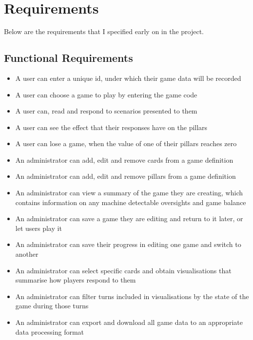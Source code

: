 \chapter{Requirements}


Below are the requirements that I specified early on in the project.

\section{Functional Requirements}

\begin{itemize}
        \item A user can enter a unique id, under which their game data will be recorded
        \item A user can choose a game to play by entering the game code
        \item A user can, read and respond to scenarios presented to them
        \item A user can see the effect that their responses have on the pillars
        \item A user can lose a game, when the value of one of their pillars reaches zero
        \item  An administrator can add, edit and remove cards from a game definition
        \item  An administrator can add, edit and remove pillars from a game definition
        \item  An administrator can view a summary of the game they are creating, which contains information on any machine detectable oversights and game balance 
        \item  An administrator can save a game they are editing and return to it later, or let users play it
        \item  An administrator can save their progress in editing one game and switch to another
        \item An administrator can select specific cards and obtain visualisations that summarise how players respond to them
        \item An administrator can filter turns included in visualisations by the state of the game during those turns
        \item An administrator can export and download all game data to an appropriate data processing format
\end{itemize}

